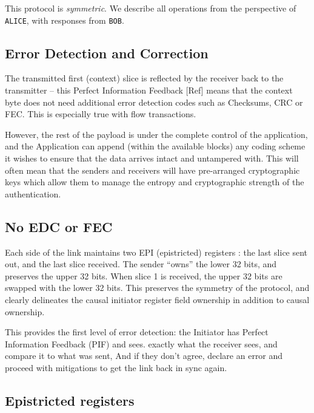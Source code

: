 \documentclass[../../../OAE-SPEC-MAIN.tex]{subfiles}
\begin{document}
This protocol is \emph{symmetric}. We describe all operations from the perspective of \texttt{ALICE}, with responses from \texttt{BOB}.


\subsection{Error Detection and Correction}

%

The transmitted first (context) slice is reflected by the receiver back to the transmitter -- this Perfect Information Feedback [Ref] means that the context byte does not need additional error detection codes such as Checksums, CRC or FEC. This is especially true with flow transactions. 

However, the rest of the payload is under the complete control of the application, and the Application can append (within the available blocks) any coding scheme it wishes to ensure that the data arrives intact and untampered with.  This will often mean that the senders and receivers will have pre-arranged cryptographic keys which allow them to manage the entropy and cryptographic strength of the authentication.

\subsection{No EDC or FEC}

Each side of the link maintains two EPI (epistricted) registers : the last slice sent out, and the last slice received. The sender “owns” the lower 32 bits, and preserves the upper 32 bits. When slice 1 is received, the upper 32 bits are swapped with the lower 32 bits.  This preserves the symmetry of the protocol, and clearly delineates the causal initiator register field ownership in addition to causal ownership.

This provides the first level of error detection: the Initiator has Perfect Information Feedback (PIF) and  sees. exactly what the receiver sees, and compare it to what was sent, And if they don’t agree, declare an error and proceed with mitigations to get the link back in sync again.

\subsection{Epistricted registers}
\end{document}
